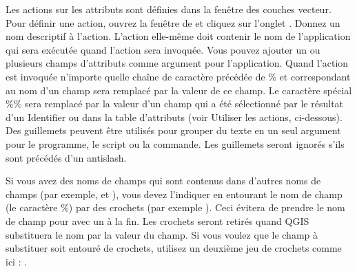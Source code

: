 Les actions sur les attributs sont d\'efinies dans la fen\^etre  des couches vecteur. Pour d\'efinir une action, ouvrez la fen\^etre de  et cliquez sur l'onglet . Donnez un nom descriptif \`a l'action. L'action elle-m\^eme doit contenir le nom de l'application qui sera ex\'ecut\'ee quand l'action sera invoqu\'ee. Vous pouvez ajouter un ou plusieurs champs d'attributs comme argument pour l'application. Quand l'action est invoqu\'ee n'importe quelle cha\^ine de caract\`ere pr\'ec\'ed\'ee de \% et correspondant au nom d'un champ sera remplac\'e par la valeur de ce champ. Le caract\`ere sp\'ecial \%\% \index{\%\%} sera remplac\'e par la valeur d'un champ qui a \'et\'e s\'electionn\'e par le r\'esultat d'un Identifier ou dans la table d'attributs (voir Utiliser les actions, ci-dessous). Des guillemets peuvent \^etre utilis\'es pour grouper du texte en un seul argument pour le programme, le script ou la commande. Les guillemets seront ignor\'es s'ils sont pr\'ec\'ed\'es d'un antislash.

Si vous avez des noms de champs qui sont contenus dans d'autres noms de champs (par exemple,  et ), vous devez l'indiquer en entourant le nom de champ (le caract\`ere \%) par des crochets (par exemple \usertext{[\%col10]}). Ceci \'evitera de prendre le nom de champ  pour  avec un  \`a la fin. Les crochets seront retir\'es quand QGIS substituera le nom par la valeur du champ. Si vous voulez que le champ \`a substituer soit entour\'e de crochets, utilisez un deuxi\`eme jeu de crochets comme ici : \usertext{[[\%col10]]}.

